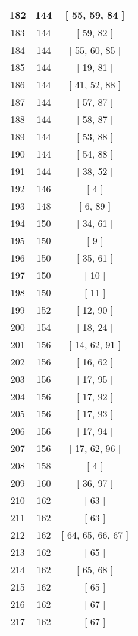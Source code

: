 \begin{center}
\begin{longtable}[H]{|| c c c ||}
\hline
182 & 144 & [ 55, 59, 84 ] \\ 
\hline
183 & 144 & [ 59, 82 ] \\ 
\hline
184 & 144 & [ 55, 60, 85 ] \\ 
\hline
185 & 144 & [ 19, 81 ] \\ 
\hline
186 & 144 & [ 41, 52, 88 ] \\ 
\hline
187 & 144 & [ 57, 87 ] \\ 
\hline
188 & 144 & [ 58, 87 ] \\ 
\hline
189 & 144 & [ 53, 88 ] \\ 
\hline
190 & 144 & [ 54, 88 ] \\ 
\hline
191 & 144 & [ 38, 52 ] \\ 
\hline
192 & 146 & [ 4 ] \\ 
\hline
193 & 148 & [ 6, 89 ] \\ 
\hline
194 & 150 & [ 34, 61 ] \\ 
\hline
195 & 150 & [ 9 ] \\ 
\hline
196 & 150 & [ 35, 61 ] \\ 
\hline
197 & 150 & [ 10 ] \\ 
\hline
198 & 150 & [ 11 ] \\ 
\hline
199 & 152 & [ 12, 90 ] \\ 
\hline
200 & 154 & [ 18, 24 ] \\ 
\hline
201 & 156 & [ 14, 62, 91 ] \\ 
\hline
202 & 156 & [ 16, 62 ] \\ 
\hline
203 & 156 & [ 17, 95 ] \\ 
\hline
204 & 156 & [ 17, 92 ] \\ 
\hline
205 & 156 & [ 17, 93 ] \\ 
\hline
206 & 156 & [ 17, 94 ] \\ 
\hline
207 & 156 & [ 17, 62, 96 ] \\ 
\hline
208 & 158 & [ 4 ] \\ 
\hline
209 & 160 & [ 36, 97 ] \\ 
\hline
210 & 162 & [ 63 ] \\ 
\hline
211 & 162 & [ 63 ] \\ 
\hline
212 & 162 & [ 64, 65, 66, 67 ] \\ 
\hline
213 & 162 & [ 65 ] \\ 
\hline
214 & 162 & [ 65, 68 ] \\ 
\hline
215 & 162 & [ 65 ] \\ 
\hline
216 & 162 & [ 67 ] \\ 
\hline
217 & 162 & [ 67 ] \\ 

\end{longtable}
\end{center}
